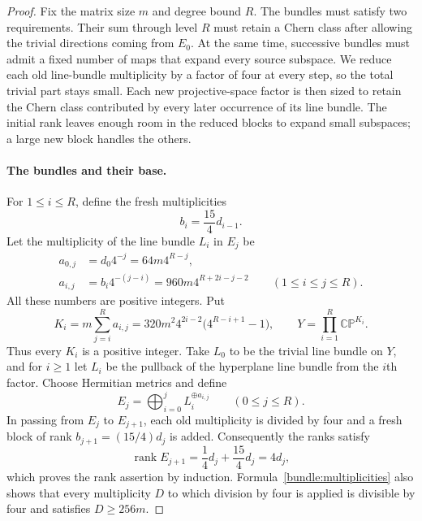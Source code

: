 \begin{proof}
Fix the matrix size $m$ and degree bound $R$.
The bundles must satisfy two requirements.  Their sum through level $R$
must retain a Chern class after allowing the trivial directions coming
from $E_0$.  At the same time, successive bundles must admit a fixed
number of maps that expand every source subspace.  We reduce each old
line-bundle multiplicity by a factor of four at every step, so the total
trivial part stays small.  Each new projective-space factor is then sized
to retain the Chern class contributed by every later occurrence of its
line bundle.  The initial rank leaves enough room in the reduced blocks
to expand small subspaces; a large new block handles the others.

\paragraph{The bundles and their base.}
For $1\leq i\leq R$, define the fresh multiplicities
\[
 b_i=\frac{15}{4}d_{i-1}.
\]
Let the multiplicity of the line bundle $L_i$ in $E_j$ be
\begin{equation}\label{bundle:multiplicities}
 \begin{split}
 a_{0,j}&=d_0 4^{-j}=64m4^{R-j},\\
 a_{i,j}&=b_i4^{-(j-i)}
          =960m4^{R+2i-j-2}\qquad(1\leq i\leq j\leq R).
 \end{split}
\end{equation}
All these numbers are positive integers.  Put
\begin{equation}\label{eq:test-base}
 K_i=m\sum_{j=i}^R a_{i,j}
     =320m^2 4^{2i-2}\bigl(4^{R-i+1}-1\bigr),
 \qquad
 Y=\prod_{i=1}^R\mathbb{CP}^{K_i}.
\end{equation}
Thus every $K_i$ is a positive integer.  Take $L_0$ to be the trivial line
bundle on $Y$, and for $i\geq1$ let $L_i$ be the pullback of the hyperplane
line bundle from the $i$th factor.  Choose Hermitian metrics and define
\[
 E_j=\bigoplus_{i=0}^j L_i^{\oplus a_{i,j}}
 \qquad(0\leq j\leq R).
\]
In passing from $E_j$ to $E_{j+1}$, each old multiplicity is divided by
four and a fresh block of rank $b_{j+1}=(15/4)d_j$ is added.
Consequently the ranks satisfy
\[
 \operatorname{rank}E_{j+1}
 =\frac14d_j+\frac{15}{4}d_j=4d_j,
\]
which proves the rank assertion by induction.  Formula~\eqref{bundle:multiplicities}
also shows that every multiplicity $D$ to which division by four is
applied is divisible by four and satisfies $D\geq256m$.


\end{proof}
